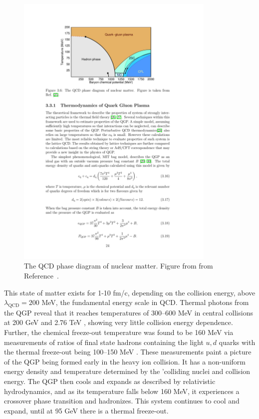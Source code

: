 \begin{figure}[htbp]
\begin{center}
\includegraphics[width=0.85\textwidth]{figures/theory/qcd_phase}
\caption{The QCD phase diagram of nuclear matter. Figure from from Reference~\cite{PhysRevD.72.034004}. }
\label{fig:qcd_phase}
\end{center}
\end{figure}

This state of matter exists for 1-10 fm/c, depending on the collision energy, above $\lambda_{\mathrm{QCD}} = 200$ MeV, the fundamental energy scale in QCD. Thermal photons from the QGP reveal that it reaches temperatures of 300--600 MeV in central collisions at 200 GeV \cite{PhysRevLett.104.132301} and 2.76 TeV \cite{2016235}, showing very little collision energy dependence. Further, the chemical freeze-out temperature was found to be 160 MeV via measurements of ratios of final state hadrons containing the light $u, d$ quarks \cite{Fodor_2004, ADAMS2005102, PhysRevC.93.024917} with the thermal freeze-out being 100--150 MeV \cite{PhysRevC.69.024904, PhysRevC.72.014908, PhysRevC.75.024910, PhysRevC.88.044910}. These measurements paint a picture of the QGP being formed early in the heavy ion collision. It has a non-uniform energy density and temperature determined by the 'colliding nuclei and collision energy. The QGP then cools and expands as described by relativistic hydrodynamics, and as its temperature falls below 160 MeV, it experiences a crossover phase transition and hadronizes. This system continues to cool and expand, until at 95 GeV there is a thermal freeze-out. 




